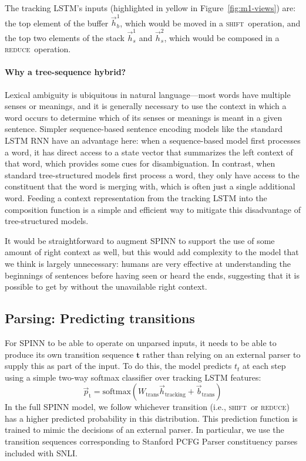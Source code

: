 \documentclass[11pt]{article}
\newcommand{\shift}{\textsc{shift}}
\newcommand{\reduce}{\textsc{reduce}}
\begin{document}
The tracking LSTM's inputs (highlighted in yellow in Figure~\ref{fig:m1-views}) are: the top element of the buffer $\vec{h}_b^1$, which would be moved in a \shift~operation, and the top two elements of the stack $\vec{h}_s^1$ and $\vec{h}_s^2$, which would be composed in a \reduce~operation.

\paragraph{Why a tree-sequence hybrid?} Lexical ambiguity is ubiquitous in natural language---most words have multiple senses or meanings, and it is generally necessary to use the context in which a word occurs to determine which of its senses or meanings is meant in a given sentence. Simpler sequence-based sentence encoding models like the standard LSTM RNN have an advantage here: when a sequence-based model first processes a word, it has direct access to a state vector that summarizes the left context of that word, which provides some cues for disambiguation. In contrast, when standard tree-structured models first process a word, they only have access to the constituent that the word is merging with, which is often just a single additional word. Feeding a context representation from the tracking LSTM into the composition function is a simple and efficient way to mitigate this disadvantage of tree-structured models. 

It would be straightforward to augment SPINN to support the use of some amount of right context as well, but this would add complexity to the model that we think is largely unnecessary: humans are very effective at understanding the beginnings of sentences before having seen or heard the ends, suggesting that it is possible to get by without the unavailable right context.

\subsection{Parsing: Predicting transitions}

For SPINN to be able to operate on unparsed inputs, it needs to be able to produce its own transition sequence $\mathbf t$ rather than relying on an external parser to supply this as part of the input. To do this, the model predicts $t_t$ at each step using a simple two-way softmax classifier over tracking LSTM features:
\begin{equation}
\vec{p}_{\text{t}} = \text{softmax}(W_{\text{trans}}\vec{h}_{\text{tracking}} + \vec{b}_{\text{trans}})
\end{equation}
In the full SPINN model, we follow whichever transition (i.e., \shift~or \reduce) has a higher predicted probability in this distribution. This prediction function is trained to mimic the decisions of an external parser. In particular, we use the transition sequences corresponding to Stanford PCFG Parser constituency parses included with SNLI.
\end{document}
